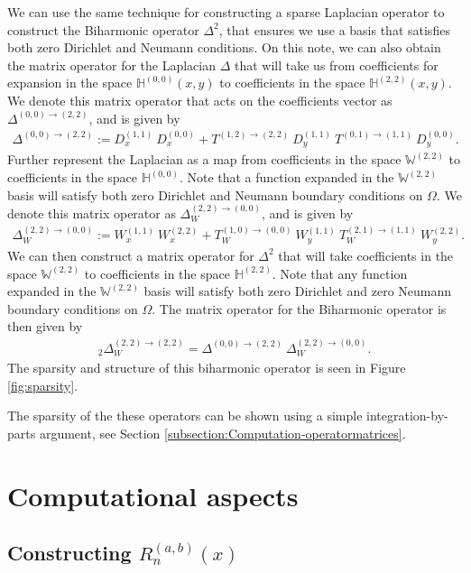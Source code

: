 \documentclass[11pt, oneside]{article}   	%
\newcommand{\hdop}{H}
\newcommand{\bighdop}{\mathbb{\hdop}}
\newcommand{\bighdopoo}{{\mathbb{\hdop}^{(0,0)}}}
\newcommand{\genjac}{R}
\newcommand{\laplacewtt}{\Delta_W^{(2,2)\to(0,0)}}
\newcommand{\laplaceoo}{\Delta^{(0,0)\to(2,2)}}
\newcommand{\biharmonic}{_2\Delta_W^{(2,2)\to(2,2)}}
\newcommand{\bigW}{\mathbb{W}}
\begin{document}
We can use the same technique for constructing a sparse Laplacian operator to construct the Biharmonic operator $\Delta^2$, that ensures we use a basis that satisfies both zero Dirichlet and Neumann conditions. On this note, we can also obtain the matrix operator for the Laplacian $\Delta$ that will take us from coefficients for expansion in the space $\bighdopoo(x,y)$ to coefficients in the space $\bighdop^{(2,2)}(x,y)$. We denote this matrix operator that acts on the coefficients vector as $\laplaceoo$, and is given by
\begin{align*}
    \laplaceoo := D_x^{(1,1)} \: D_x^{(0,0)} + T^{(1,2)\to(2,2)} \: D_y^{(1,1)} \: T^{(0,1)\to(1,1)} \: D_y^{(0,0)}.
\end{align*}
Further represent the Laplacian as a map from coefficients in the space $\bigW^{(2,2)}$ to coefficients in the space $\bighdopoo$. Note that a function expanded in the $\bigW^{(2,2)}$ basis will satisfy both zero Dirichlet and Neumann boundary conditions on $\Omega$. We denote this matrix operator as $\laplacewtt$, and is given by
\begin{align*}
	\laplacewtt := W_x^{(1,1)} \: W_x^{(2,2)} + T_W^{(1,0)\to(0,0)} \: W_y^{(1,1)} \: T_W^{(2,1)\to(1,1)} \: W_y^{(2,2)}.
\end{align*}
We can then construct a matrix operator for $\Delta^2$ that will take coefficients in the space $\bigW^{(2,2)}$ to coefficients in the space $\bighdop^{(2,2)}$. Note that any function expanded in the $\bigW^{(2,2)}$ basis will satisfy both zero Dirichlet and zero Neumann boundary conditions on $\Omega$. The matrix operator for the Biharmonic operator is then given by
\begin{align*}
	\biharmonic = \laplaceoo \: \laplacewtt.
\end{align*}
The sparsity and structure of this biharmonic operator is seen in Figure \ref{fig:sparsity}.

The sparsity of the these operators can be shown using a simple integration-by-parts argument, see Section \ref{subsection:Computation-operatormatrices}.



\section{Computational aspects}\label{Section:Computation}

\subsection{Constructing $\genjac_n^{(a,b)}(x)$}
\end{document}
